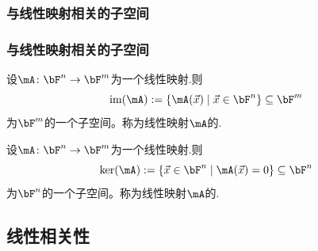 \subsubsection{与线性映射相关的子空间}
\begin{frame}\frametitle{与线性映射相关的子空间}

\begin{example}
设$\mA\colon \bF^n\rightarrow \bF^m$为一个线性映射.则
\[\mathrm{im}(\mA):=\{\mA(\vec{x}) \mid \vec{x}\in \bF^n\} \subseteq \bF^m\]
为$\bF^m$的一个子空间。称为线性映射$\mA$的.
\end{example}
\pp

\begin{example}
设$\mA\colon \bF^n\rightarrow \bF^m$为一个线性映射.则
\[\ker(\mA):=\{\vec{x} \in \bF^n \mid \mA(\vec{x})=0\} \subseteq \bF^n\]
为$\bF^n$的一个子空间。称为线性映射$\mA$的.
\end{example}
\end{frame}





\subsection{线性相关性}

